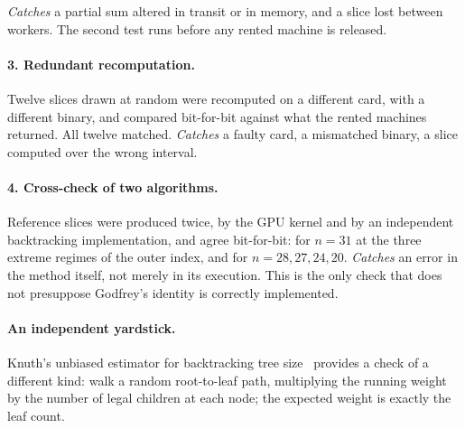 \documentclass[11pt,a4paper]{article}
\begin{document}
\emph{Catches} a partial sum altered in transit or in memory, and a slice lost
between workers. The second test runs before any rented machine is released.

\paragraph{3. Redundant recomputation.} Twelve slices drawn at random were
recomputed on a different card, with a different binary, and compared
bit-for-bit against what the rented machines returned. All twelve matched.
\emph{Catches} a faulty card, a mismatched binary, a slice computed over the
wrong interval.

\paragraph{4. Cross-check of two algorithms.} Reference slices were produced
twice, by the GPU kernel and by an independent backtracking implementation, and
agree bit-for-bit: for $n=31$ at the three extreme regimes of the outer index,
and for $n=28,27,24,20$. \emph{Catches} an error in the method itself, not
merely in its execution. This is the only check that does not presuppose
Godfrey's identity is correctly implemented.

\paragraph{An independent yardstick.} Knuth's unbiased estimator for
backtracking tree size~\cite{knuth75} provides a check of a different kind: walk
a random root-to-leaf path, multiplying the running weight by the number of
legal children at each node; the expected weight is exactly the leaf count.
\end{document}
